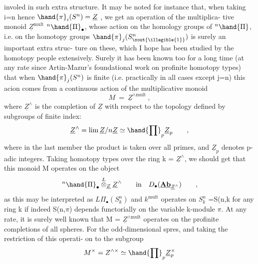 
involed in such extra structure.  It may be noted for instance that,
when taking i=n  hence $\hand{\pi}_i(S^n)=\underline{Z}$ ,  we get an operation of the multiplica-%
tive monoid  $\underline{Z}^{\mathrm{mult}}$  ${}^n\hand{\Pi}_\bullet$,  whose action on the homology groups of ${}^n\hand{\Pi}$,
i.e. on the homotopy groups  $\hand{\pi}_j(S^n_{\xout{\illegible{1}}})$\hand{,} is surely an important extra struc-%
ture on these,  which I hope has been studied by the homotopy people
extensively.  Surely it has been known too for a long time (at any rate
since Artin-Mazur's foundational work on profinite homotopy types) that
when $\hand{\pi}_j(S^n)$ is finite (i.e. practically in all cases except j=n) this
acion comes from a continuous action of  the multiplicative 
monoid  
\[ M \ = \ \underline{Z}^{\wedge\mathrm{mult}} \ , \]
where  $\underline{Z}^\wedge$ is the completion of $\underline{Z}$ with respect to the topology defined by
subgroups of finite index:
\[ \underline{Z}^\wedge = \lim \underline{Z}/n\underline{Z} \simeq \hand{\prod}_p \underline{Z}_p \qquad , \]
where in the last member the product is taken over all primes,  and $\underline{Z}_p$
denotes p-adic integers.  Taking homotopy types over the ring k = $\underline{Z}^\wedge$,
we should get that this monoid  M operates on the object
\[ {}^n\hand{\Pi}_\bullet \overset{L}{\otimes}_{\underline{Z}}\underline{Z}^\wedge \qquad \text{in} \quad D_\bullet(\underline{\mathbf{Ab}}_{\underline{Z}^\wedge}) \qquad , \]
as this may be interpreted as  $L\Pi_\bullet(S^n_k)$\hand{,} and  $k^{\mathrm{mult}}$  operates on $S^n_k$ =S(n,k\hand{)}
for any ring k \hand{(}if indeed  S(n,$\pi$)  depends functorially on the variable
k-module $\pi$\hand{)}.  \deleted{(}At any rate,  it is surely well\unsure{\hand{-}} known that 
M = $\underline{Z}^{\wedge\mathrm{mult}}$  operates on the profinite completions of all spheres.  For
the odd-dimensional spres,  and taking the restriction of this operati-%
on to the  subgroup
\[ M^\times = Z^{\wedge\times} \simeq \hand{\prod}_p \underline{Z}_p^\times \]
